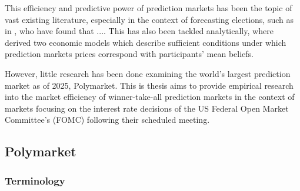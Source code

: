 


This efficiency and predictive power of prediction markets has been the topic
of vast existing literature, especially in the context of forecasting elections, such as in
\textcite{berg_prediction_2008} \textcite{erikson_are_2008}, who have found that .... 
This has also been tackled analytically, where \textcite{wolfers_interpreting_2006} derived two economic models which
describe sufficient conditions under which prediction markets prices correspond with participants' mean beliefs.

However, little research has been done examining the world's largest prediction market as of 2025, Polymarket.
This is thesis aims to provide empirical research into the market efficiency of winner-take-all prediction markets 
in the context of markets focusing on the interest rate decisions of the US Federal Open Market Committee's (FOMC) following their scheduled meeting.

\newpage

\subsection{Polymarket}


\subsubsection{Terminology}


